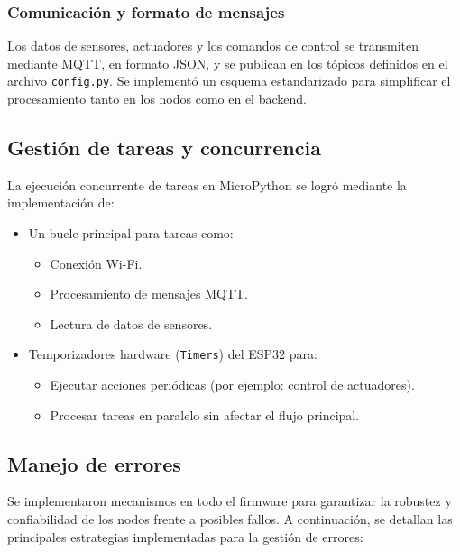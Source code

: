 \subsubsection{Comunicación y formato de mensajes}

Los datos de sensores, actuadores y los comandos de control se transmiten
mediante MQTT, en formato JSON, y se publican en los tópicos definidos en el
archivo \texttt{config.py}. Se implementó un esquema estandarizado para
simplificar el procesamiento tanto en los nodos como en el backend.


\subsection{Gestión de tareas y concurrencia}

La ejecución concurrente de tareas en MicroPython se logró mediante la
implementación de:

\begin{itemize}
    \item Un bucle principal para tareas como:
          \begin{itemize}
              \item Conexión Wi-Fi.
              \item Procesamiento de mensajes MQTT.
              \item Lectura de datos de sensores.
          \end{itemize}
    \item Temporizadores hardware (\texttt{Timers}) del ESP32 para:
          \begin{itemize}
              \item Ejecutar acciones periódicas (por ejemplo: control de actuadores).
              \item Procesar tareas en paralelo sin afectar el flujo principal.
          \end{itemize}
\end{itemize}


\subsection{Manejo de errores}

Se implementaron mecanismos en todo el firmware para garantizar la robustez y
confiabilidad de los nodos frente a posibles fallos. A continuación, se
detallan las principales estrategias implementadas para la gestión de errores:


